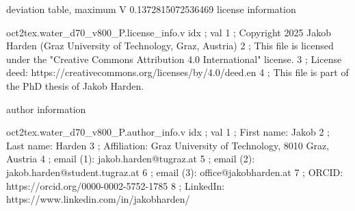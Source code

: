 \expandafter\def\csname oct2tex.water_d70_v800_P.dtabmax.d\endcsname{deviation table, maximum}
\expandafter\def\csname oct2tex.water_d70_v800_P.dtabmax.u\endcsname{\ensuremath{\text{V}}}
\expandafter\def\csname oct2tex.water_d70_v800_P.dtabmax.v\endcsname{0.1372815072536469}
\expandafter\def\csname oct2tex.water_d70_v800_P.license_info.d\endcsname{license information}
\begin{filecontents}[overwrite]{oct2tex.water_d70_v800_P.license_info.v}
idx ; val
1 ; Copyright 2025 Jakob Harden (Graz University of Technology, Graz, Austria)
2 ; This file is licensed under the "Creative Commons Attribution 4.0 International" license.
3 ; License deed: https://creativecommons.org/licenses/by/4.0/deed.en
4 ; This file is part of the PhD thesis of Jakob Harden.
\end{filecontents}
\expandafter\def\csname oct2tex.water_d70_v800_P.author_info.d\endcsname{author information}
\begin{filecontents}[overwrite]{oct2tex.water_d70_v800_P.author_info.v}
idx ; val
1 ; First name: Jakob
2 ; Last name: Harden
3 ; Affiliation: Graz University of Technology, 8010 Graz, Austria
4 ; email (1): jakob.harden@tugraz.at
5 ; email (2): jakob.harden@student.tugraz.at
6 ; email (3): office@jakobharden.at
7 ; ORCID: https://orcid.org/0000-0002-5752-1785
8 ; LinkedIn: https://www.linkedin.com/in/jakobharden/
\end{filecontents}
